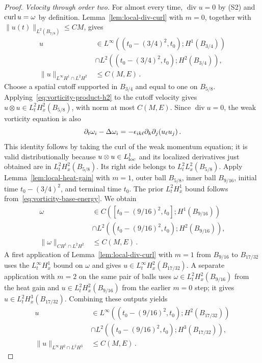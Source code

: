 \documentclass[11pt,letterpaper]{article}
\numberwithin{equation}{section}
\theoremstyle{plain}
\theoremstyle{definition}
\theoremstyle{remark}
\begin{document}
\begin{proof}
\emph{Velocity through order two.} For almost every time, $\operatorname{div}u=0$ by (S2) and $\operatorname{curl} u=\omega$ by definition. Lemma~\ref{lem:local-div-curl} with $m=0$, together with $\|u(t)\|_{L^2(B_{7/8})}\le C M$, gives
\[
\begin{aligned}
 u&\in L^\infty((t_0-(3/4)^2,t_0);H^1(B_{3/4}))\\
  &\cap L^2((t_0-(3/4)^2,t_0);H^2(B_{3/4})),\\
 \|u\|_{L^\infty H^1\cap L^2H^2}&\le C(M,E)\,.
\end{aligned}
\]
Choose a spatial cutoff supported in $B_{3/4}$ and equal to one on $B_{5/8}$. Applying~\eqref{eq:vorticity-product-h2} to the cutoff velocity gives $u\otimes u\in L^2_tH^2_x(B_{5/8})$, with norm at most $C(M,E)$. Since $\operatorname{div}u=0$, the weak vorticity equation is also
\[
 \partial_t\omega_i-\Delta\omega_i
 =-\epsilon_{ik\ell}\partial_k\partial_j(u_\ell u_j)\,.
\]
This identity follows by taking the curl of the weak momentum equation; it is valid distributionally because $u\otimes u\in L^1_{\rm loc}$ and its localized derivatives just obtained are in $L^2_tH^2_x(B_{5/8})$. Its right side belongs to $L^2_tL^2_x(B_{5/8})$. Apply Lemma~\ref{lem:local-heat-gain} with $m=1$, outer ball $B_{5/8}$, inner ball $B_{9/16}$, initial time $t_0-(3/4)^2$, and terminal time $t_0$. The prior $L^2_tH^1_x$ bound follows from~\eqref{eq:vorticity-base-energy}. We obtain
\[
\begin{aligned}
 \omega&\in C([t_0-(9/16)^2,t_0];H^1(B_{9/16}))\\
  &\cap L^2((t_0-(9/16)^2,t_0);H^2(B_{9/16})),\\
 \|\omega\|_{C H^1\cap L^2H^2}&\le C(M,E)\,.
\end{aligned}
\]
A first application of Lemma~\ref{lem:local-div-curl} with $m=1$ from $B_{9/16}$ to $B_{17/32}$ uses the $L^\infty_tH^1_x$ bound on $\omega$ and gives $u\in L^\infty_tH^2_x(B_{17/32})$. A separate application with $m=2$ on the same pair of balls uses $\omega\in L^2_tH^2_x(B_{9/16})$ from the heat gain and $u\in L^2_tH^2_x(B_{9/16})$ from the earlier $m=0$ step; it gives $u\in L^2_tH^3_x(B_{17/32})$. Combining these outputs yields
\[
\begin{aligned}
 u&\in L^\infty((t_0-(9/16)^2,t_0);H^2(B_{17/32}))\\
  &\cap L^2((t_0-(9/16)^2,t_0);H^3(B_{17/32})),\\
 \|u\|_{L^\infty H^2\cap L^2H^3}&\le C(M,E)\,.
\end{aligned}
\]


\end{proof}
\end{document}
